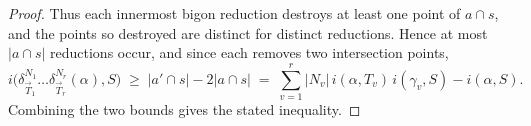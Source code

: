 \documentclass[12pt,a4paper]{amsart}
\numberwithin{equation}{section}
\theoremstyle{plain}
\newtheorem{lemma}[theorem]{Lemma}
\theoremstyle{definition}
\theoremstyle{remark}
\begin{document}
\begin{proof}
    Thus each innermost bigon reduction destroys at least one point of $a \cap s$, and the points so destroyed are distinct for distinct reductions.
    Hence at most $\lvert a \cap s \rvert$ reductions occur, and since each removes two intersection points,
    \[
        i\bigl(\delta_{\vec T_1}^{N_1} \dots \delta_{\vec T_r}^{N_r}(\alpha), S\bigr)
        \;\ge\; \lvert a' \cap s \rvert - 2 \lvert a \cap s \rvert
        \;=\; \sum_{v=1}^{r} \lvert N_v \rvert \, i(\alpha, T_v) \, i(\gamma_v, S) - i(\alpha, S) .
    \]
    Combining the two bounds gives the stated inequality.
\end{proof}


    

\end{document}

